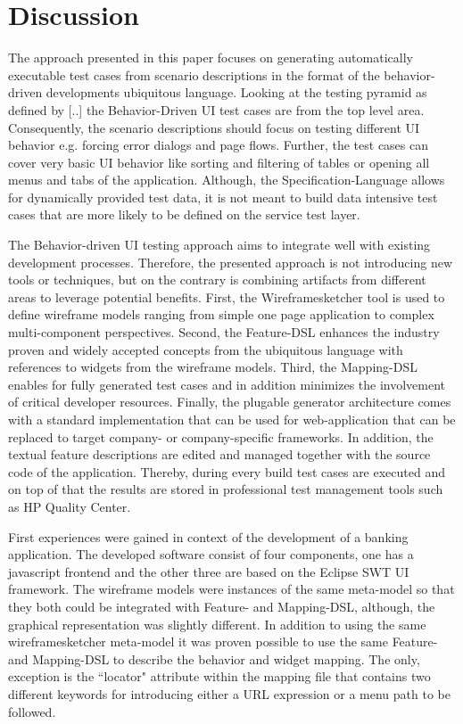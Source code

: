 \documentclass{sig-alternate-05-2015}
\begin{document}
\section{Discussion}\label{sec:Discussion}
The approach presented in this paper focuses on generating automatically executable test cases from scenario descriptions in the format of the behavior-driven developments ubiquitous language.
Looking at the testing pyramid as defined by [..] the Behavior-Driven UI test cases are from the top level area.
Consequently, the scenario descriptions should focus on testing different UI behavior e.g. forcing error dialogs and page flows.
Further, the test cases can cover very basic UI behavior like sorting and filtering of tables or opening all menus and tabs of the application. 
Although, the Specification-Language allows for dynamically provided test data, it is not meant to build data intensive test cases that are more likely to be defined on the service test layer.

The Behavior-driven UI testing approach aims to integrate well with existing development processes. 
Therefore, the presented approach is not introducing new tools or techniques, but on the contrary is combining artifacts from different areas to leverage potential benefits.
First, the Wireframesketcher tool is used to define wireframe models ranging from simple one page application to complex multi-component perspectives.
Second, the Feature-DSL enhances the industry proven and widely accepted concepts from the ubiquitous language with references to widgets from the wireframe models.
Third, the Mapping-DSL enables for fully generated test cases and in addition minimizes the involvement of critical developer resources. 
Finally, the plugable generator architecture comes with a standard implementation that can be used for web-application that can be replaced to target company- or company-specific frameworks.
In addition, the textual feature descriptions are edited and managed together with the source code of the application.
Thereby, during every build test cases are executed and on top of that the results are stored in professional test management tools such as HP Quality Center.


First experiences were gained in context of the development of a banking application. 
The developed software consist of four components, one has a javascript frontend and the other three are based on the Eclipse SWT UI framework.
The wireframe models were instances of the same meta-model so that they both could be integrated with Feature- and Mapping-DSL, although, the graphical representation was slightly different.
In addition to using the same wireframesketcher meta-model it was proven possible to use the same Feature- and Mapping-DSL to describe the behavior and widget mapping.
The only, exception is the ``locator" attribute within the mapping file that contains two different keywords for introducing either a URL expression or a menu path to be followed.
\end{document}
